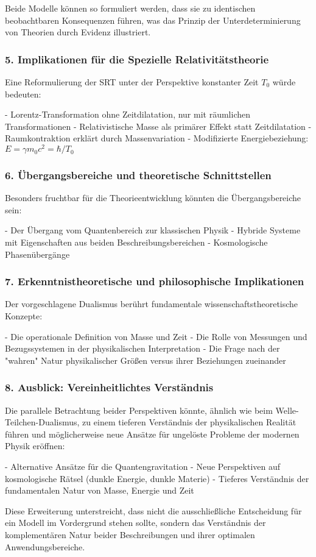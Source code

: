 \documentclass{article}
\begin{document}
	Beide Modelle können so formuliert werden, dass sie zu identischen beobachtbaren Konsequenzen führen, was das Prinzip der Unterdeterminierung von Theorien durch Evidenz illustriert.
	
	\subsubsection{5. Implikationen für die Spezielle Relativitätstheorie}
	
	Eine Reformulierung der SRT unter der Perspektive konstanter Zeit \( T_0 \) würde bedeuten:
	
	- Lorentz-Transformation ohne Zeitdilatation, nur mit räumlichen Transformationen
	- Relativistische Masse als primärer Effekt statt Zeitdilatation
	- Raumkontraktion erklärt durch Massenvariation
	- Modifizierte Energiebeziehung: \( E = \gamma m_0 c^2 = \hbar / T_0 \)
	
	\subsubsection{6. Übergangsbereiche und theoretische Schnittstellen}
	
	Besonders fruchtbar für die Theorieentwicklung könnten die Übergangsbereiche sein:
	
	- Der Übergang vom Quantenbereich zur klassischen Physik
	- Hybride Systeme mit Eigenschaften aus beiden Beschreibungsbereichen
	- Kosmologische Phasenübergänge
	
	\subsubsection{7. Erkenntnistheoretische und philosophische Implikationen}
	
	Der vorgeschlagene Dualismus berührt fundamentale wissenschaftstheoretische Konzepte:
	
	- Die operationale Definition von Masse und Zeit
	- Die Rolle von Messungen und Bezugssystemen in der physikalischen Interpretation
	- Die Frage nach der "wahren" Natur physikalischer Größen versus ihrer Beziehungen zueinander
	
	\subsubsection{8. Ausblick: Vereinheitlichtes Verständnis}
	
	Die parallele Betrachtung beider Perspektiven könnte, ähnlich wie beim Welle-Teilchen-Dualismus, zu einem tieferen Verständnis der physikalischen Realität führen und möglicherweise neue Ansätze für ungelöste Probleme der modernen Physik eröffnen:
	
	- Alternative Ansätze für die Quantengravitation
	- Neue Perspektiven auf kosmologische Rätsel (dunkle Energie, dunkle Materie)
	- Tieferes Verständnis der fundamentalen Natur von Masse, Energie und Zeit
	
	Diese Erweiterung unterstreicht, dass nicht die ausschließliche Entscheidung für ein Modell im Vordergrund stehen sollte, sondern das Verständnis der komplementären Natur beider Beschreibungen und ihrer optimalen Anwendungsbereiche.
	
\end{document}

